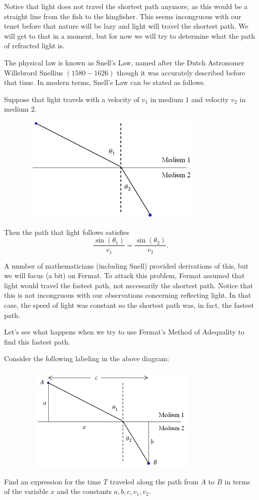 Notice that light does not travel the shortest path anymore, as this
would be a straight line from the fish to the kingfisher.  This seems
incongruous with our tenet before that nature will be lazy and light
will travel the shortest path.  We will get to that in a moment, but
for now we will try to determine what the path of refracted light is.

The physical law is known as Snell's Law, named after the Dutch
Astronomer Willebrord Snellius $(1580-1626)$ though it was accurately
described before that time.  In modern terms, Snell's Law can be
stated as follows.

 Suppose that light travels
with a velocity of $v_1$ in medium $1$ and velocity $v_2$ in medium
$2.$\\
\centerline{\includegraphics*[height=2in,width=4.5in]{Figures/Refraction2}}
Then the path that light follows satisfies 
$$
\frac{\sin(\theta_1)}{v_1} = \frac{\sin(\theta_2)}{v_2 }.
$$

A number of mathematicians (including Snell) provided derivations of
this, but we will focus (a bit) on Fermat.  To attack this problem,
Fermat assumed that light would travel the fastest path, not
necessarily the shortest path.  Notice that this is not incongruous
with our observations concerning reflecting light.  In that case, the
speed of light was constant so the shortest path was, in fact, the
fastest path.

Let's see what happens when we try to use Fermat's Method of
Adequality to find this fastest path.

\begin{embeddedproblem}{}
  \label{FermatSnell}
  Consider the following labeling in the above diagram:\\
  \centerline{\includegraphics*[height=2in,width=4.5in]{Figures/Refraction3}}
  Find an expression for the time $T$ traveled along the path from $A$ to
  $B$ in terms of the variable $x$ and the constants $a, b, c, v_1, v_2.$
\end{embeddedproblem}

